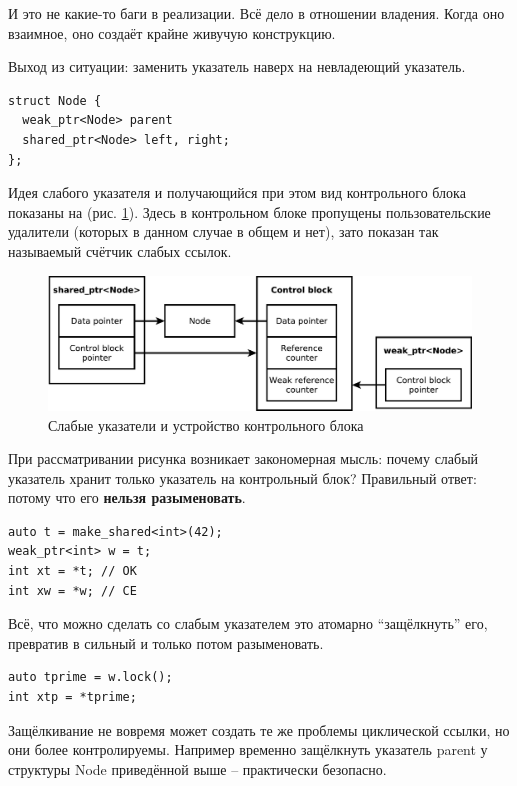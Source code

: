 \documentclass[a4paper,12pt,oneside]{article}
\begin{document}
И это не какие-то баги в реализации. Всё дело в отношении владения. Когда оно взаимное, оно создаёт крайне живучую конструкцию.

Выход из ситуации: заменить указатель наверх на невладеющий указатель.

\begin{lstlisting}
struct Node {
  weak_ptr<Node> parent
  shared_ptr<Node> left, right;
};
\end{lstlisting}

Идея слабого указателя и получающийся при этом вид контрольного блока показаны на (рис. \ref{fig:smartptrs-weak-outer}). Здесь в контрольном блоке пропущены пользовательские удалители (которых в данном случае в общем и нет), зато показан так называемый счётчик слабых ссылок.

\begin{figure}[ht]
\centering
\includegraphics[width=1.0\textwidth]{illustrations/smartptrs-weak-outer-crop.pdf}
\caption{Слабые указатели и устройство контрольного блока}
\label{fig:smartptrs-weak-outer}
\end{figure}

При рассматривании рисунка возникает закономерная мысль: почему слабый указатель хранит только указатель на контрольный блок? Правильный ответ: потому что его \textbf{нельзя разыменовать}.

\begin{lstlisting}
auto t = make_shared<int>(42);
weak_ptr<int> w = t;
int xt = *t; // OK
int xw = *w; // CE
\end{lstlisting}

Всё, что можно сделать со слабым указателем это атомарно ``защёлкнуть'' его, превратив в сильный и только потом разыменовать.

\begin{lstlisting}
auto tprime = w.lock();
int xtp = *tprime;
\end{lstlisting}

Защёлкивание не вовремя может создать те же проблемы циклической ссылки, но они более контролируемы. Например временно защёлкнуть указатель parent у структуры Node приведённой выше -- практически безопасно.
\end{document}
